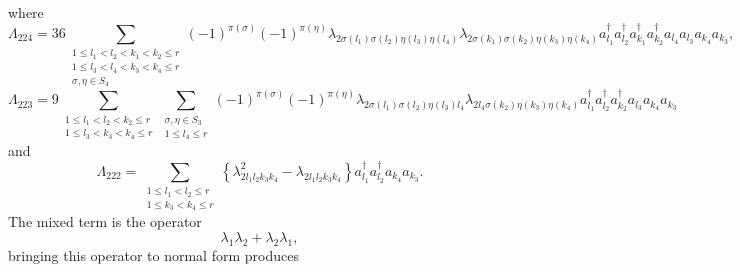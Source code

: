 \documentclass[aps,preprint]{revtex4}%
\begin{document}
where
\begin{equation}
\Lambda_{224}=36\sum_{\substack{1\leq l_{1}<l_{2}<k_{1}<k_{2}\leq r\\1\leq
l_{3}<l_{4}<k_{3}<k_{4}\leq r\\\sigma,\eta\in S_{4}}}\left(  -1\right)
^{\pi\left(  \sigma\right)  }\left(  -1\right)  ^{\pi\left(  \eta\right)
}\lambda_{2\sigma\left(  l_{1}\right)  \sigma\left(  l_{2}\right)  \eta\left(
l_{3}\right)  \eta\left(  l_{4}\right)  }\lambda_{2\sigma\left(  k_{1}\right)
\sigma\left(  k_{2}\right)  \eta\left(  k_{3}\right)  \eta\left(
k_{4}\right)  }a_{l_{1}}^{\dagger}a_{l_{2}}^{\dagger}a_{k_{1}}^{\dagger
}a_{k_{2}}^{\dagger}a_{l_{4}}a_{l_{3}}a_{k_{4}}a_{k_{3}},
\end{equation}%
\begin{equation}
\Lambda_{223}=9\sum_{\substack{1\leq l_{1}<l_{2}<k_{2}\leq r\\1\leq
l_{3}<k_{3}<k_{4}\leq r}}\sum_{\substack{\sigma,\eta\in S_{3}\\1\leq l_{4}\leq
r}}\left(  -1\right)  ^{\pi\left(  \sigma\right)  }\left(  -1\right)
^{\pi\left(  \eta\right)  }\lambda_{2\sigma\left(  l_{1}\right)  \sigma\left(
l_{2}\right)  \eta\left(  l_{3}\right)  l_{4}}\lambda_{2l_{4}\sigma\left(
k_{2}\right)  \eta\left(  k_{3}\right)  \eta\left(  k_{4}\right)  }a_{l_{1}%
}^{\dagger}a_{l_{2}}^{\dagger}a_{k_{2}}^{\dagger}a_{l_{3}}a_{k_{4}}a_{k_{3}}%
\end{equation}
and
\begin{equation}
\Lambda_{222}=\sum_{\substack{1\leq l_{1}<l_{2}\leq r\\1\leq k_{3}<k_{4}\leq
r}}\left\{  \lambda_{2l_{1}l_{2}k_{3}k_{4}}^{2}-\lambda_{2l_{1}l_{2}k_{3}%
k_{4}}\right\}  a_{l_{1}}^{\dagger}a_{l_{2}}^{\dagger}a_{k_{4}}a_{k_{3}%
}.\nonumber
\end{equation}
The mixed term is the operator
\begin{equation}
\lambda_{1}\lambda_{2}+\lambda_{2}\lambda_{1},
\end{equation}
bringing this operator to normal form produces
\end{document}
